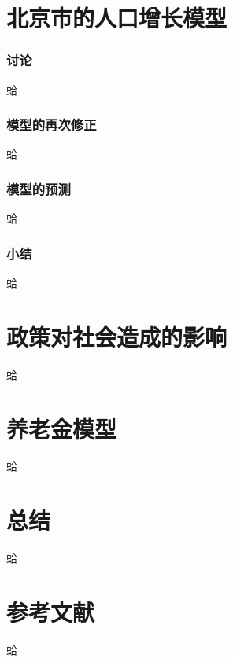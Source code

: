 \documentclass[11pt]{article}
\begin{document}
\part{北京市的人口增长模型}
	\section{讨论}
		蛤
	\section{模型的再次修正}
		蛤
	\section{模型的预测}
		蛤
	\section{小结}
		蛤
	
\part{政策对社会造成的影响}
	蛤

\part{养老金模型}
	蛤

\part{总结}
	蛤

\part*{参考文献}
	蛤
\end{document}

